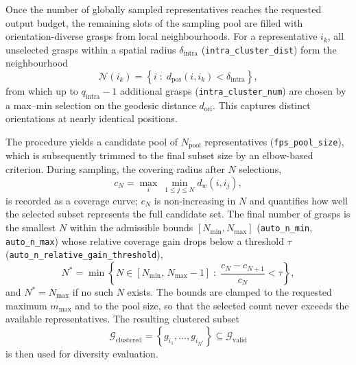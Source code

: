 \begin{enumerate}
Once the number of globally sampled representatives reaches the requested output budget,
the remaining slots of the sampling pool are filled with orientation-diverse grasps from
local neighbourhoods. For a representative $i_k$, all unselected grasps within a spatial
radius $\delta_{\mathrm{intra}}$ (\texttt{intra\_cluster\_dist}) form the neighbourhood
\begin{equation}
    \mathcal{N}(i_k) =
    \left\{ i \;:\; d_{\mathrm{pos}}(i, i_k) < \delta_{\mathrm{intra}} \right\},
\end{equation}
from which up to $q_{\mathrm{intra}} - 1$ additional grasps
(\texttt{intra\_cluster\_num}) are chosen by a max--min selection on the geodesic
distance $d_{\mathrm{ori}}$. This captures distinct orientations at nearly identical
positions.

The procedure yields a candidate pool of $N_{\mathrm{pool}}$ representatives
(\texttt{fps\_pool\_size}), which is subsequently trimmed to the final subset size by an
elbow-based criterion. During sampling, the covering radius after $N$ selections,
\begin{equation}
    c_N = \max_{i}\ \min_{1 \le j \le N} d_w(i, i_j),
\end{equation}
is recorded as a coverage curve; $c_N$ is non-increasing in $N$ and quantifies how well
the selected subset represents the full candidate set. The final number of grasps is the
smallest $N$ within the admissible bounds $[N_{\min}, N_{\max}]$
(\texttt{auto\_n\_min}, \texttt{auto\_n\_max}) whose relative coverage gain drops below a
threshold $\tau$ (\texttt{auto\_n\_relative\_gain\_threshold}),
\begin{equation}
    N^{*} =
    \min \left\{
        N \in [N_{\min},\, N_{\max}-1] \;:\;
        \frac{c_N - c_{N+1}}{c_N} < \tau
    \right\},
\end{equation}
and $N^{*} = N_{\max}$ if no such $N$ exists. The bounds are clamped to the requested
maximum $m_{\max}$ and to the pool size, so that the selected count never exceeds the
available representatives. The resulting clustered subset
\begin{equation}
    \mathcal{G}_{\mathrm{clustered}}
    = \left\{ g_{i_1}, \dots, g_{i_{N^{*}}} \right\}
    \subseteq \mathcal{G}_{\mathrm{valid}}
\end{equation}
is then used for diversity evaluation.


\end{enumerate}
